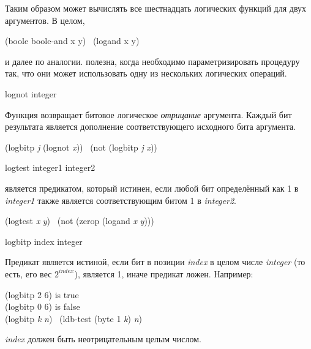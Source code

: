 \begin{defun}[Функция][Константа]
Таким образом  может вычислять все шестнадцать логических функций для
двух аргументов. В целом,
\begin{lisp}
(boole boole-and x y) \EQ\ (logand x y)
\end{lisp}
и далее по аналогии.  полезна, когда необходимо
параметризировать процедуру так, что они может использовать одну из нескольких
логических операций. 
\end{defun}

\begin{defun}[Функция]
lognot integer

Функция возвращает битовое логическое \emph{отрицание} аргумента.
Каждый бит результата является дополнение соответствующего исходного бита
аргумента.
\begin{lisp}
(logbitp \emph{j} (lognot \emph{x})) \EQ\ (not (logbitp \emph{j} \emph{x}))
\end{lisp}
\end{defun}

\begin{defun}[Функция]
logtest integer1 integer2

 является предикатом, который истинен, если любой бит определённый
как 1 в \emph{integer1} также является соответствующим битом 1 в
\emph{integer2}.
\begin{lisp}
(logtest \emph{x} \emph{y}) \EQ\ (not (zerop (logand \emph{x} \emph{y})))
\end{lisp}
\end{defun}

\begin{defun}[Функция]
logbitp index integer

Предикат  является истиной, если бит в позиции \emph{index} в целом
числе \emph{integer} (то есть, его вес $2^{index}$), является 1, иначе предикат
ложен.
Например:
\begin{lisp}
(logbitp 2 6) \textrm{is true} \\
(logbitp 0 6) \textrm{is false} \\
(logbitp \emph{k} \emph{n}) \EQ\ (ldb-test (byte 1 \emph{k}) \emph{n})
\end{lisp}

\emph{index} должен быть неотрицательным целым числом.
\end{defun}

